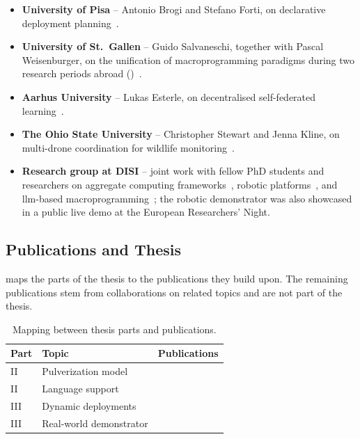 \documentclass[a4paper,11pt]{article}
\begin{document}
\begin{itemize}
  \item \textbf{University of Pisa} -- Antonio Brogi and Stefano Forti, on declarative deployment planning~\cite{DBLP:conf/coordination/BrogiCFFV25}.
  \item \textbf{University of St.~Gallen} -- Guido Salvaneschi, together with Pascal Weisenburger, on the unification of macroprogramming paradigms during two research periods abroad ()~\cite{farabegoli2026capabilities}.
  \item \textbf{Aarhus University} -- Lukas Esterle, on decentralised self-federated learning~\cite{DBLP:conf/acsos/DominiAFVE24,DBLP:journals/iot/DominiFAVE26}.
  \item \textbf{The Ohio State University} -- Christopher Stewart and Jenna Kline, on multi-drone coordination for wildlife monitoring~\cite{DBLP:conf/acsos/GrushchakKPFABS24,DBLP:conf/acsos/GrushchakKPF24}.
  \item \textbf{Research group at DISI} -- joint work with fellow PhD students and researchers on aggregate computing frameworks~\cite{DBLP:conf/coordination/AguzziDFV26}, robotic platforms~\cite{DBLP:conf/coordination/AguzziBBCCDFPV25,farabegoli2027emerge,DBLP:conf/ccnc/AndruccioliCDFDPVV26}, and \ac{llm}-based macroprogramming~\cite{DBLP:journals/tiot/AguzziFV25};
  the robotic demonstrator was also showcased in a public live demo at the European Researchers' Night.
\end{itemize}

\subsection{Publications and Thesis}
\label{sec:thesis}

 maps the parts of the thesis to the publications they build upon.
%
The remaining publications stem from collaborations on related topics and are not part of the thesis.

\begin{table}[ht]
  \centering
  \small
  \caption{Mapping between thesis parts and publications.}
  \label{tab:thesis}
  \begin{tabularx}{\textwidth}{@{}lXl@{}}
    \toprule
    Part & Topic & Publications \\
    \midrule
    II  & Pulverization model & \cite{DBLP:journals/fgcs/FarabegoliPCV24,DBLP:conf/acsos/FarabegoliVC24} \\
    II  & Language support & \cite{farabegoli2026capabilities,DBLP:conf/coordination/FarabegoliTAV26,DBLP:journals/tiot/AguzziFV25} \\
    III & Dynamic deployments & \cite{DBLP:journals/iot/FarabegoliPCV24,DBLP:conf/coordination/BrogiCFFV25,DBLP:journals/fgcs/FarabegoliDAV26} \\
    III & Real-world demonstrator & \cite{DBLP:conf/coordination/AguzziBBCCDFPV25,farabegoli2027emerge} \\
    \bottomrule
  \end{tabularx}
\end{table}
\end{document}
